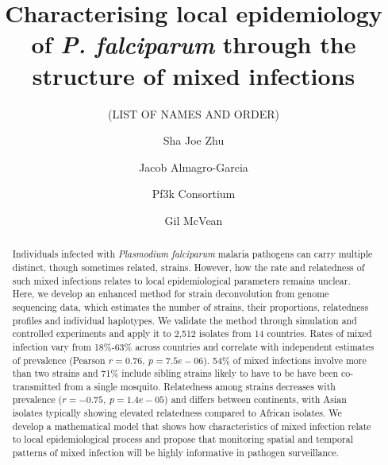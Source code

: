 \documentclass[9pt,lineno]{elife}
\newcounter{todocounter}
\newcommand{\done}[2][]
{\todo[color=green!40, #1]{#2}}
\newcommand{\donenum}[2][]
{\stepcounter{todocounter}\done[#1]{\thetodocounter: #2}}
\begin{document}
\title{Characterising local epidemiology of {\it P. falciparum} through the structure of mixed infections}
\newcommand\shorttitle{Mixed infections in malaria}
\date{}

\author{(LIST OF NAMES AND ORDER)}
\author[1]{Sha Joe Zhu}
\author[1,2,3,4]{Jacob Almagro-Garcia}
\author[]{Pf3k Consortium}
\author[1,3]{Gil McVean}



\maketitle
{}
\listoftodos
{}





\begin{abstract}
Individuals infected with {\it Plasmodium falciparum} malaria pathogens can carry multiple distinct, though sometimes related, strains.  However, how the rate and relatedness of such mixed infections relates to local epidemiological parameters remains unclear.  Here, we develop an enhanced method for strain deconvolution from genome sequencing data, which estimates the number of strains, their proportions, relatedness profiles and individual haplotypes.  We validate the method through simulation and controlled experiments and apply it to 2,512 isolates from 14 countries.  Rates of mixed infection vary from 18\%-63\% across countries and correlate with independent estimates of prevalence (Pearson $r = 0.76,~p = 7.5e-06$).  54\% of mixed infections involve more than two strains and 71\% include sibling strains likely to have to be have been co-transmitted from a single mosquito.  Relatedness among strains decreases with prevalence ($r = -0.75,~p = 1.4e-05$) and differs between continents, with Asian isolates typically showing elevated relatedness compared to African isolates.  We develop a mathematical model that shows how characteristics of mixed infection relate to local epidemiological process and propose that monitoring spatial and temporal patterns of mixed infection will be highly informative in pathogen surveillance.
\end{abstract}
\end{document}
